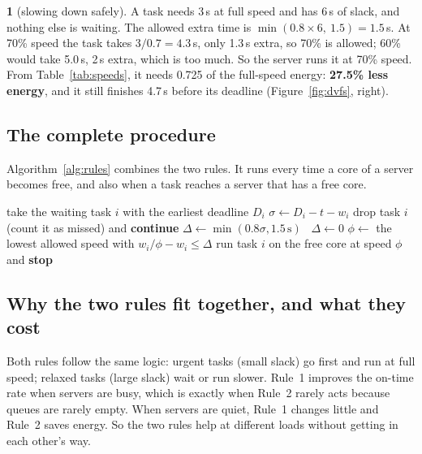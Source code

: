 \documentclass[11pt]{article}
\theoremstyle{definition}
\newcommand{\textblockname}{}
\newtheorem*{textblock*}{\textblockname}
\newenvironment{workedexample}[1]{%
  \renewcommand{\textblockname}{Worked example #1}%
  \def\FrameCommand{{\color{accent}\vrule width 2.25pt}\hspace{8pt}}%
  \MakeFramed{\advance\hsize-10.25pt\FrameRestore}%
  \begin{textblock*}}{\end{textblock*}%
  \endMakeFramed}
\begin{document}
\begin{workedexample}{2}[slowing down safely]
A task needs 3\,s at full speed and has 6\,s of slack, and nothing else is waiting. The allowed extra time is
$\min(0.8 \times 6,\ 1.5) = 1.5$\,s. At 70\% speed the task takes $3/0.7 = 4.3$\,s, only 1.3\,s extra, so 70\% is
allowed; 60\% would take 5.0\,s, 2\,s extra, which is too much. So the server runs it at 70\% speed. From
Table~\ref{tab:speeds}, it needs 0.725 of the full-speed energy: \textbf{27.5\% less energy}, and it still
finishes 4.7\,s before its deadline (Figure~\ref{fig:dvfs}, right).
\end{workedexample}

\subsection{The complete procedure}
Algorithm~\ref{alg:rules} combines the two rules. It runs every time a core of a server becomes free, and also
when a task reaches a server that has a free core.

\begin{algorithm}[!htbp]
\caption{What a server does when a CPU core becomes free at time $t$}
\label{alg:rules}
\begin{algorithmic}[1]
  \State take the waiting task $i$ with the earliest deadline $D_i$ 
  \State $\sigma \gets D_i - t - w_i$ 
     \State drop task $i$ (count it as missed) and \textbf{continue} 
  \EndIf
   $\Delta \gets \min(0.8\sigma, 1.5\,\text{s})$
  \Else\ $\Delta \gets 0$
  \EndIf
  \State $\phi \gets$ the lowest allowed speed with $w_i/\phi - w_i \le \Delta$ 
  \State run task $i$ on the free core at speed $\phi$ and \textbf{stop}
\EndWhile
\end{algorithmic}
\end{algorithm}

\subsection{Why the two rules fit together, and what they cost}
Both rules follow the same logic: urgent tasks (small slack) go first and run at full speed; relaxed tasks
(large slack) wait or run slower. Rule~1 improves the on-time rate when servers are busy, which is exactly when
Rule~2 rarely acts because queues are rarely empty. When servers are quiet, Rule~1 changes little and Rule~2 saves
energy. So the two rules help at different loads without getting in each other's way.
\end{document}
